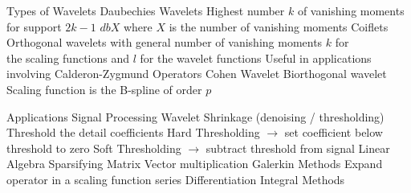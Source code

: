 \documentclass[14pt]{extarticle}
\begin{document}
\begin{outline}
		\1	Types of Wavelets	
			\2	Daubechies Wavelets
				\3	Highest number $k$ of vanishing moments for support $2k - 1$
				\3	$dbX$ where $X$ is the number of vanishing moments
			\2	Coiflets
				\3	Orthogonal wavelets with general number of vanishing moments $k$ for \\
						the scaling functions and $l$ for the wavelet functions
				\3	Useful in applications involving Calderon-Zygmund Operators
			\2	Cohen Wavelet
				\3	Biorthogonal wavelet
				\3	Scaling function is the B-spline of order $p$
		
		\1	Applications
			\2	Signal Processing
				\3	Wavelet Shrinkage (denoising / thresholding)
					\4	Threshold the detail coefficients
					\4	Hard Thresholding $\rightarrow$ set coefficient below threshold to zero
					\4	Soft Thresholding $\rightarrow$ subtract threshold from signal
			\2	Linear Algebra
				\3	Sparsifying Matrix Vector multiplication
				\3	Galerkin Methods
					\4	Expand operator in a scaling function series	
					\4	Differentiation
					\4	Integral Methods

	\end{outline}
\end{document}
